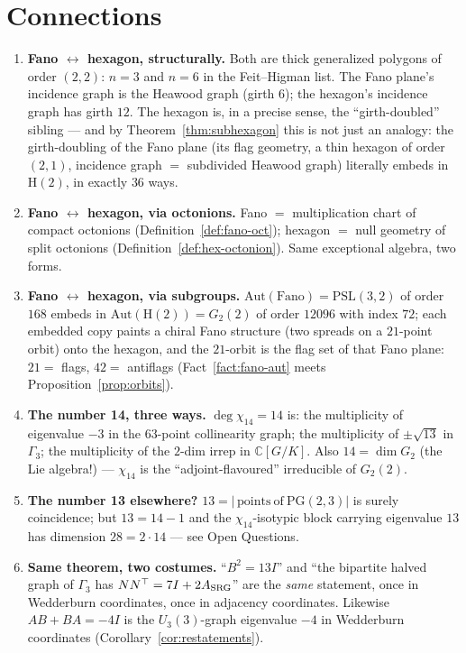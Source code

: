 \documentclass[11pt]{article}
\theoremstyle{definition}
\newcommand{\C}{\mathbb{C}}
\newcommand{\PG}{\mathrm{PG}}
\newcommand{\PSL}{\mathrm{PSL}}
\newcommand{\Aut}{\mathrm{Aut}}
\begin{document}
\section{Connections}\label{sec:connections}

\begin{enumerate}
\item \textbf{Fano $\leftrightarrow$ hexagon, structurally.} Both are thick
generalized polygons of order $(2,2)$: $n = 3$ and $n = 6$ in the
Feit--Higman list. The Fano plane's incidence graph is the Heawood graph
(girth $6$); the hexagon's incidence graph has girth $12$. The hexagon is,
in a precise sense, the ``girth-doubled'' sibling --- and by
Theorem~\ref{thm:subhexagon} this is not just an analogy: the
girth-doubling of the Fano plane (its flag geometry, a thin hexagon of
order $(2,1)$, incidence graph $=$ subdivided Heawood graph) literally
embeds in $\mathrm H(2)$, in exactly $36$ ways.
\item \textbf{Fano $\leftrightarrow$ hexagon, via octonions.} Fano $=$
multiplication chart of compact octonions
(Definition~\ref{def:fano-oct}); hexagon $=$ null geometry of split
octonions (Definition~\ref{def:hex-octonion}). Same exceptional algebra,
two forms.
\item \textbf{Fano $\leftrightarrow$ hexagon, via subgroups.}
$\Aut(\text{Fano}) = \PSL(3,2)$ of order $168$ embeds in
$\Aut(\mathrm H(2)) = G_2(2)$ of order $12096$ with index $72$; each
embedded copy paints a chiral Fano structure (two spreads on a
$21$-point orbit) onto the hexagon, and the $21$-orbit is the flag set of
that Fano plane: $21 = $ flags, $42 = $ antiflags
(Fact~\ref{fact:fano-aut} meets Proposition~\ref{prop:orbits}).
\item \textbf{The number 14, three ways.} $\deg\chi_{14} = 14$ is:
the multiplicity of eigenvalue $-3$ in the $63$-point collinearity graph;
the multiplicity of $\pm\sqrt{13}$ in $\Gamma_3$; the multiplicity of the
$2$-dim irrep in $\C[G/K]$. Also $14 = \dim G_2$ (the Lie algebra!) ---
$\chi_{14}$ is the ``adjoint-flavoured'' irreducible of $G_2(2)$.
\item \textbf{The number 13 elsewhere?} $13 = |\,\mathrm{points\ of\ }
\PG(2,3)|$ is surely coincidence; but $13 = 14 - 1$ and the
$\chi_{14}$-isotypic block carrying eigenvalue $13$ has dimension
$28 = 2\cdot 14$ --- see Open Questions.
\item \textbf{Same theorem, two costumes.} ``$B^2 = 13I$'' and ``the
bipartite halved graph of $\Gamma_3$ has $NN^\top = 7I + 2A_{\rm SRG}$''
are the \emph{same} statement, once in Wedderburn coordinates, once in
adjacency coordinates. Likewise $AB + BA = -4I$ is the $U_3(3)$-graph
eigenvalue $-4$ in Wedderburn coordinates
(Corollary~\ref{cor:restatements}).
\end{enumerate}
\end{document}
